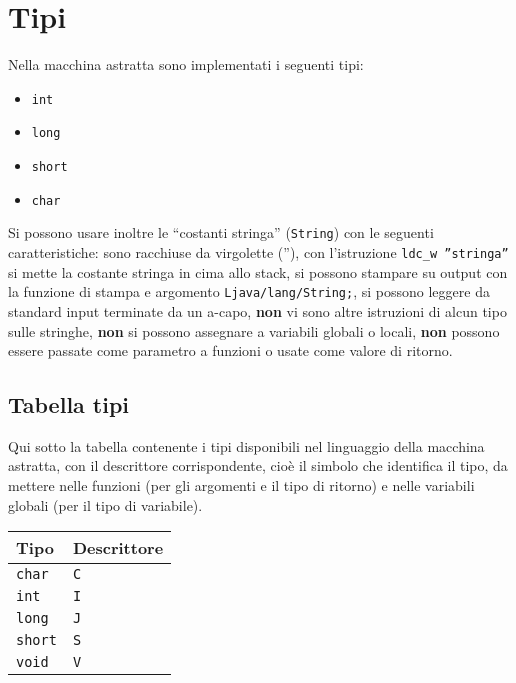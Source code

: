 \section{Tipi}
\label{sec:tipi}
Nella macchina astratta sono implementati i seguenti tipi:
\begin{itemize}
  \item \texttt{int}
  \item \texttt{long}
  \item \texttt{short}
  \item \texttt{char}
\end{itemize}
Si possono usare inoltre le ``costanti stringa'' (\texttt{String}) con le seguenti caratteristiche: sono racchiuse da virgolette (''), con l'istruzione \texttt{ldc\_w ''stringa''} si mette la costante stringa in cima allo stack, si possono stampare su output con la funzione di stampa e argomento \texttt{Ljava/lang/String;}, si possono leggere da standard input terminate da un a-capo, \textbf{non} vi sono altre istruzioni di alcun tipo sulle stringhe, \textbf{non} si possono assegnare a variabili globali o locali, \textbf{non} possono essere passate come parametro a funzioni o usate come valore di ritorno.

\subsection{Tabella tipi}
\label{sec:tabella_tipi}
Qui sotto la tabella contenente i tipi disponibili nel linguaggio della macchina astratta, con il descrittore corrispondente, cio\`e il simbolo che identifica il tipo, da mettere nelle funzioni (per gli argomenti e il tipo di ritorno) e nelle variabili globali (per il tipo di variabile).

{\footnotesize
\begin{center}
\begin{tabular}{p{2cm} l}
\toprule
\rowcolor[gray]{0.9}
  \textbf{Tipo} &
  \textbf{Descrittore} \\
\toprule
  \texttt{char} &
  \texttt{C} \\
  \texttt{int} &
  \texttt{I} \\
  \texttt{long} &
  \texttt{J} \\
  \texttt{short} &
  \texttt{S} \\
  \texttt{void} &
  \texttt{V} \\
\bottomrule
\end{tabular}
\label{tab:tabella_tipi}
\end{center}
} %

